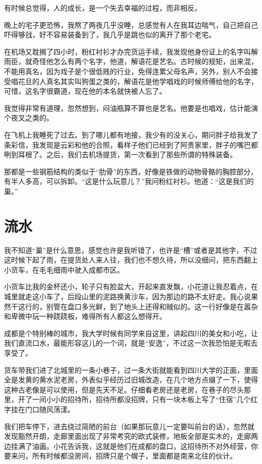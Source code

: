 有时候总觉得，人的成长，是一个失去幸福的过程，而非相反。

晚上的宅子更恐怖，我熬了两夜几乎没睡，总感觉有人在我耳边喘气，自己把自己吓得够戗，好不容易装备到了，我几乎是跳也似的离开了那个老宅。

在机场又耽搁了四小时，粉红衬衫才办完货运手续，我发现他身份证上的名字叫解雨臣，就奇怪他怎么有两个名字，他道，解语花是艺名。古时候的规矩，出来混，不能用真名，因为戏子是个很低贱的行业，免得连累父母名声，另外，别人不会接受唱花旦的人真名其实叫狗蛋之类的，解语花是他学唱戏的时候师傅给他的名字，可惜，这名字很霸道，现在他的本名就快被人忘了。

我觉得非常有道理，忽然想到，闷油瓶算不算也是艺名。他要是也唱戏，估计能演个夜叉之类的。

在飞机上我睡死了过去。到了哪儿都有地接，我少有的没关心，期问胖子给我发了条彩信，我发现是云彩和他的合照，看样子他们已经到了阿贵家里，胖子的嘴巴都咧到耳根了。之后，我们去机场提货，第一次看到了那些所谓的特殊装备。

那都是一些钢筋结构的类似于“肋骨”的东西，好像是铁做的动物骨骼的胸腔部分，有半人多高，可以拆卸。“这是什么玩意儿？”我问粉红衬衫。他道：“这是我们的巢。”

\chapter{流水}

我不知道“巢”是什么意思，感觉也许是我听错了，也许是“槽”或者是其他字，不过这时候下起了雨，在提货处人来人往，我们也不想久待，所以没细问，把东西翻上小货车，在毛毛细雨中驶入成都市区。

小货车比我的金杯还小，轮子只有脸盆大，开起来直发飘，小花道让我忍着点，在城里就走这小车了，后段山里的泥路换黄沙车，因为那边的路不太好走。我心说果然干这行的，别管在盘口多光鲜，到了地头上还得和贼似的。这一行好像是在嚣杂和卑微中玩一种跷跷板，难得所有人都这么想得开。

成都是个特别棒的城市，我大学时候有同学来自这里，讲起四川的美女和小吃，让我们直流口水，最能形容这儿的一个词，就是“安逸”，不过这一次我恐怕是无暇去享受了。

货车带我们进了北城里的一条小巷子，过一条大街就能看到四川大学的正面，里面全是发黄的黄水泥老房，外表似乎经历过旧城改造，在几个地方点缀了一下，使得这种古老像是可以使用，但是先天不足。仔细看老房还是老房，在巷子的尽头那里，开了一间小小的招待所，招待所都没招牌，只有一块木板上写了“住宿”几个红字挂在门口随风荡漾。

我们把车停下，进去绕过简陋的前台（如果那玩意儿一定要叫前台的话），忽然就发现豁然开朗，走廊里面出现了非常考究的欧式装修，地板全部是实木的，走廊两边挂满了油画。小花告诉我，这就是他们在成都的盘口，这招待所不对外经营，你要来问，所有时候都没房间，招牌只是个幌子，里面都是南来北往的伙计。

